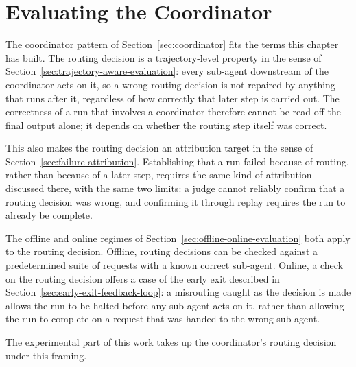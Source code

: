 \section{Evaluating the Coordinator}
\label{sec:evaluating-coordinator}

The coordinator pattern of Section~\ref{sec:coordinator} fits the terms this chapter has built. The routing decision is a trajectory-level property in the sense of Section~\ref{sec:trajectory-aware-evaluation}: every sub-agent downstream of the coordinator acts on it, so a wrong routing decision is not repaired by anything that runs after it, regardless of how correctly that later step is carried out. The correctness of a run that involves a coordinator therefore cannot be read off the final output alone; it depends on whether the routing step itself was correct.

This also makes the routing decision an attribution target in the sense of Section~\ref{sec:failure-attribution}. Establishing that a run failed because of routing, rather than because of a later step, requires the same kind of attribution discussed there, with the same two limits: a judge cannot reliably confirm that a routing decision was wrong, and confirming it through replay requires the run to already be complete.

The offline and online regimes of Section~\ref{sec:offline-online-evaluation} both apply to the routing decision. Offline, routing decisions can be checked against a predetermined suite of requests with a known correct sub-agent. Online, a check on the routing decision offers a case of the early exit described in Section~\ref{sec:early-exit-feedback-loop}: a misrouting caught as the decision is made allows the run to be halted before any sub-agent acts on it, rather than allowing the run to complete on a request that was handed to the wrong sub-agent.

The experimental part of this work takes up the coordinator's routing decision under this framing.

